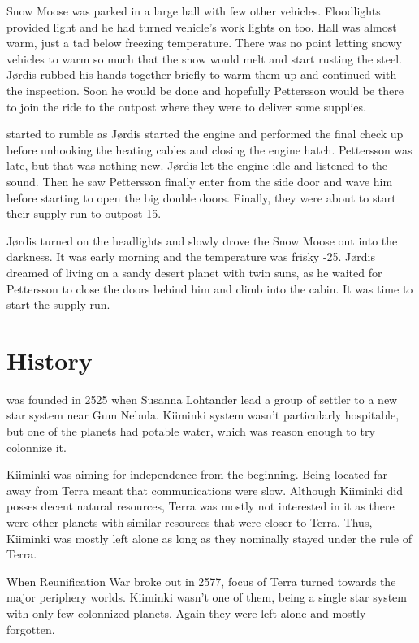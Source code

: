 \documentclass{tufte-book}
\begin{document}
Snow Moose was parked in a large hall with few other vehicles.
Floodlights provided light and he had turned vehicle's work lights on
too. Hall was almost warm, just a tad below freezing temperature.
There was no point letting snowy vehicles to warm so much that the
snow would melt and start rusting the steel. J\o rdis rubbed his hands
together briefly to warm them up and continued with the inspection.
Soon he would be done and hopefully Pettersson would be there to
join the ride to the outpost where they were to deliver some
supplies.

 started to rumble as J\o rdis started the
engine and performed the final check up before unhooking the heating
cables and closing the engine hatch. Pettersson was late, but that was
nothing new. J\o rdis let the engine idle and listened to the sound.
Then he saw Pettersson finally enter from the side door and wave him
before starting to open the big double doors. Finally, they were about
to start their supply run to outpost 15.

J\o rdis turned on the headlights and slowly drove the Snow Moose out
into the darkness. It was early morning and the temperature was frisky
-25\celsius. J\o rdis dreamed of living on a sandy desert planet with
twin suns, as he waited for Pettersson to close the doors behind him 
and climb into the cabin. It was time to start the supply run.

\chapter{History}
\label{ch:history}

 was founded in 2525 when Susanna Lohtander
lead a group of settler to a new star system near Gum Nebula. Kiiminki system
wasn't particularly hospitable, but one of the planets had potable water,
which was reason enough to try colonnize it.

Kiiminki was aiming for independence from the beginning. Being located far
away from Terra meant that communications were slow. Although Kiiminki did
posses decent natural resources, Terra was mostly not interested in it as
there were other planets with similar resources that were closer to Terra.
Thus, Kiiminki was mostly left alone as long as they nominally stayed under
the rule of Terra.

When Reunification War broke out in 2577, focus of Terra turned towards the
major periphery worlds. Kiiminki wasn't one of them, being a single star
system with only few colonnized planets. Again they were left alone and
mostly forgotten.
\end{document}
